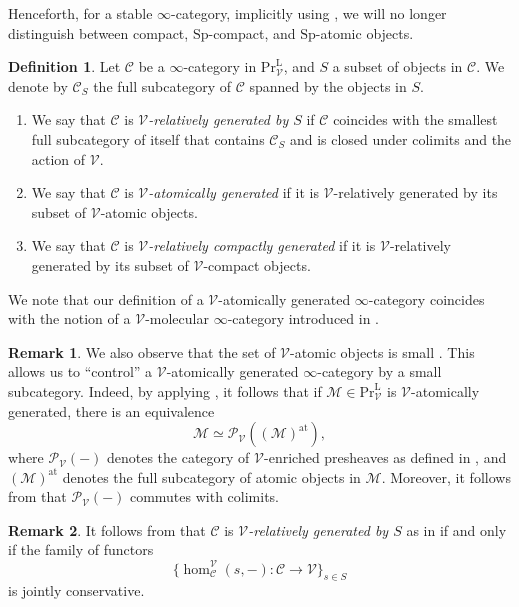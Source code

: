 \documentclass[oneside, hidelinks, 12pt, a4paper,reqno]{amsart}
\theoremstyle{plain}
\theoremstyle{definition}
\newtheorem{definition}[definition]{Definition}
\newtheorem{remark}[remark]{Remark}
\theoremstyle{plain}
\newcommand{\cC}{\mathscr C}
\newcommand{\cM}{\mathscr M}
\newcommand{\cP}{\mathscr P}
\newcommand{\cV}{\mathscr V}
\newcommand{\cat}{$\infty$-category }
\newcommand{\LPrV}{\mathrm{Pr}^{\mathrm{L}}_{\cV}}
\begin{document}
Henceforth, for a stable $\infty$-category, implicitly using , we will no longer distinguish between compact, $\mathrm{Sp}$-compact, and $\mathrm{Sp}$-atomic objects.

\begin{definition}\label{def: categorie relativamente generate}
    Let $\cC$ be a \cat in $\LPrV$, and $S$ a subset of objects in $\cC$. We denote by $\cC_{S}$ the full subcategory of $\cC$ spanned by the objects in $S$.
    \begin{enumerate}
        \item We say that $\cC$ is \emph{$\cV$-relatively generated by $S$} if $\cC$ coincides with the smallest full subcategory of itself that contains $\cC_{S}$ and is closed under colimits and the action of $\cV$.
        \item We say that $\cC$ is \emph{$\cV$-atomically generated} if it is $\cV$-relatively generated by its subset of $\cV$-atomic objects.
        \item We say that $\cC$ is \emph{$\cV$-relatively compactly generated} if it is $\cV$-relatively generated by its subset of $\cV$-compact objects.
    \end{enumerate}
\end{definition}

We note that our definition of a $\cV$-atomically generated \cat coincides with the notion of a $\cV$-molecular \cat introduced in \cite[Definition 2.10]{BenMoshe2024}.

\begin{remark}\label{rmk: V-enriched presheaves}
   We also observe that the set of $\cV$-atomic objects is small \cite[Proposition 5.9]{BenMoshe2024}. This allows us to ``control'' a $\cV$-atomically generated \cat by a small subcategory. Indeed, by applying \cite[Observation 1.28]{ramzi2024dualizablepresentableinftycategories}, it follows that if $\cM \in \LPrV$ is $\cV$-atomically generated, there is an equivalence 
\[
\cM \simeq \cP_\cV((\cM)^\mathrm{at}),
\]
where $\cP_{\cV}(-)$ denotes the category of $\cV$-enriched presheaves as defined in \cite{heine2023}, and $(\cM)^{\mathrm{at}}$ denotes the full subcategory of atomic objects in $\cM$. Moreover, it follows from \cite[Section 6]{BenMoshe2024} that $\cP_{\cV}(-)$ commutes with colimits.
\end{remark}

\begin{remark}\label{rmk: relative generators and generated under colimits and action}
    It follows from \cite[Corollary 3.13]{reutter2025enrichedinftycategoriesmarkedmodule} that $\cC$ is \emph{$\cV$-relatively generated by $S$} as in  if and only if the family of functors
    \[
    \{\hom_{\cC}^{\cV}(s,-)\colon \cC \to \cV\}_{s \in S}
    \]
    is jointly conservative.
\end{remark}
\end{document}
